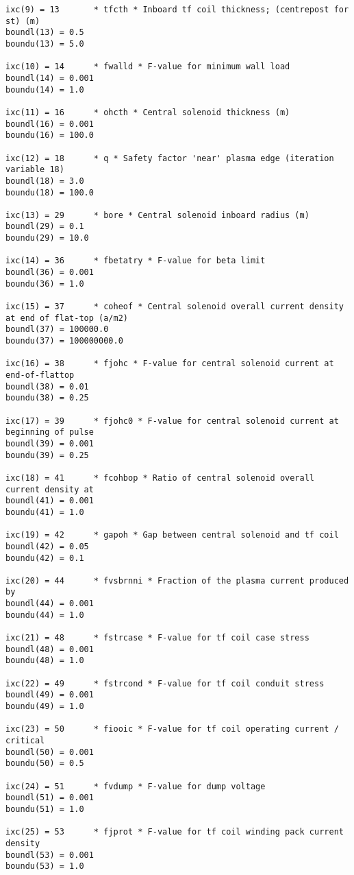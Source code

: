 \documentclass[11pt,a4paper]{report}
\begin{document}
\begin{verbatim}
ixc(9) = 13       * tfcth * Inboard tf coil thickness; (centrepost for st) (m)
boundl(13) = 0.5  
boundu(13) = 5.0  

ixc(10) = 14      * fwalld * F-value for minimum wall load
boundl(14) = 0.001  
boundu(14) = 1.0  

ixc(11) = 16      * ohcth * Central solenoid thickness (m)
boundl(16) = 0.001  
boundu(16) = 100.0  

ixc(12) = 18      * q * Safety factor 'near' plasma edge (iteration variable 18)
boundl(18) = 3.0  
boundu(18) = 100.0  

ixc(13) = 29      * bore * Central solenoid inboard radius (m)
boundl(29) = 0.1  
boundu(29) = 10.0  

ixc(14) = 36      * fbetatry * F-value for beta limit
boundl(36) = 0.001  
boundu(36) = 1.0  

ixc(15) = 37      * coheof * Central solenoid overall current density at end of flat-top (a/m2)
boundl(37) = 100000.0  
boundu(37) = 100000000.0  

ixc(16) = 38      * fjohc * F-value for central solenoid current at end-of-flattop
boundl(38) = 0.01  
boundu(38) = 0.25  

ixc(17) = 39      * fjohc0 * F-value for central solenoid current at beginning of pulse
boundl(39) = 0.001  
boundu(39) = 0.25  

ixc(18) = 41      * fcohbop * Ratio of central solenoid overall current density at
boundl(41) = 0.001  
boundu(41) = 1.0  

ixc(19) = 42      * gapoh * Gap between central solenoid and tf coil
boundl(42) = 0.05  
boundu(42) = 0.1  

ixc(20) = 44      * fvsbrnni * Fraction of the plasma current produced by
boundl(44) = 0.001  
boundu(44) = 1.0  

ixc(21) = 48      * fstrcase * F-value for tf coil case stress
boundl(48) = 0.001  
boundu(48) = 1.0  

ixc(22) = 49      * fstrcond * F-value for tf coil conduit stress
boundl(49) = 0.001  
boundu(49) = 1.0  

ixc(23) = 50      * fiooic * F-value for tf coil operating current / critical
boundl(50) = 0.001  
boundu(50) = 0.5  

ixc(24) = 51      * fvdump * F-value for dump voltage
boundl(51) = 0.001  
boundu(51) = 1.0  

ixc(25) = 53      * fjprot * F-value for tf coil winding pack current density
boundl(53) = 0.001  
boundu(53) = 1.0  


\end{verbatim}
\end{document}
